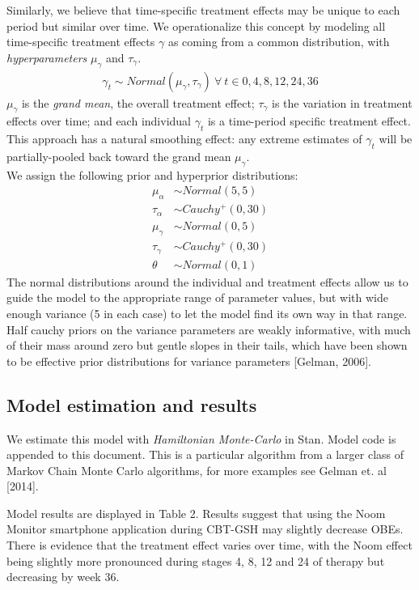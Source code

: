 \documentclass{article}
\begin{document}
%
Similarly, we believe that time-specific treatment effects may be unique to each period but similar over time. We operationalize this concept by modeling all time-specific treatment effects $\gamma$ as coming from a common distribution, with \emph{hyperparameters} $\mu_{\gamma}$ and $\tau_{\gamma}$.
%
\begin{align}
\gamma_t \sim Normal(\mu_{\gamma}, \tau_{\gamma}) \ \forall \ t \in 0, 4, 8, 12, 24, 36
\end{align} 
%
$\mu_{\gamma}$ is the \emph{grand mean}, the overall treatment effect; $\tau_{\gamma}$ is the variation in treatment effects over time; and each individual $\gamma_t$ is a time-period specific treatment effect.  This approach has a natural smoothing effect: any extreme estimates of $\gamma_t$ will be partially-pooled back toward the grand mean $\mu_{\gamma}$.\\
%
We assign the following prior and hyperprior distributions:
\begin{align}
\mu_{\alpha} &\sim Normal(5, 5) \\
\tau_{\alpha} &\sim Cauchy^+(0, 30) \\
\mu_{\gamma} &\sim Normal(0, 5) \\
\tau_{\gamma} &\sim Cauchy^+(0, 30) \\
\theta &\sim Normal(0, 1)
\end{align}
%
The normal distributions around the individual and treatment effects allow us to guide the model to the appropriate range of parameter values, but with wide enough variance (5 in each case) to let the model find its own way in that range.  Half cauchy priors on the variance parameters are weakly informative, with much of their mass around zero but gentle slopes in their tails, which have been shown to be effective prior distributions for variance parameters [Gelman, 2006].

\subsection{Model estimation and results}
We estimate this model with \emph{Hamiltonian Monte-Carlo} in Stan.  Model code is appended to this document. This is a particular algorithm from a larger class of Markov Chain Monte Carlo algorithms, for more examples see Gelman et. al [2014].

Model results are displayed in Table 2.  Results suggest that using the Noom Monitor smartphone application during CBT-GSH may slightly decrease OBEs.  There is evidence that the treatment effect varies over time, with the Noom effect being slightly more pronounced during stages 4, 8, 12 and 24 of therapy but decreasing by week 36.\\
\end{document}
